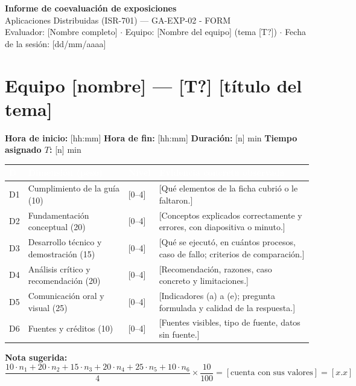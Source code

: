 \documentclass[11pt,a4paper]{article}
\newcommand{\hdr}[1]{\textcolor{white}{\textbf{#1}}}
\begin{document}
\begin{center}
	{\Large\bfseries\color{uteqBlue} Informe de coevaluación de exposiciones}\\[4pt]
	{\large Aplicaciones Distribuidas (ISR-701) --- GA-EXP-02 - FORM}\\[4pt]
	Evaluador: [Nombre completo] \quad $\cdot$ \quad Equipo: [Nombre del equipo] (tema [T?]) \quad $\cdot$ \quad Fecha de la sesión: [dd/mm/aaaa]
\end{center}

\section{Equipo [nombre] --- [T?] [título del tema]}

\textbf{Hora de inicio:} [hh:mm] \quad \textbf{Hora de fin:} [hh:mm] \quad \textbf{Duración:} [n] min \quad \textbf{Tiempo asignado $T$:} [n] min

\begin{tabularx}{\linewidth}{|C{0.9cm}|L{3.4cm}|C{1.1cm}|Y|}
	\hline
	\hdr{D} & \hdr{Dimensión (peso)} & \hdr{Nivel} & \hdr{Evidencia concreta observada} \\
	\hline
	D1 & Cumplimiento de la guía (10) & [0--4] & [Qué elementos de la ficha cubrió o le faltaron.] \\
	\hline
	D2 & Fundamentación conceptual (20) & [0--4] & [Conceptos explicados correctamente y errores, con diapositiva o minuto.] \\
	\hline
	D3 & Desarrollo técnico y demostración (15) & [0--4] & [Qué se ejecutó, en cuántos procesos, caso de fallo; criterios de comparación.] \\
	\hline
	D4 & Análisis crítico y recomendación (20) & [0--4] & [Recomendación, razones, caso concreto y limitaciones.] \\
	\hline
	D5 & Comunicación oral y visual (25) & [0--4] & [Indicadores (a) a (e); pregunta formulada y calidad de la respuesta.] \\
	\hline
	D6 & Fuentes y créditos (10) & [0--4] & [Fuentes visibles, tipo de fuente, datos sin fuente.] \\
	\hline
\end{tabularx}

\textbf{Nota sugerida:}
\[
	\frac{10 \cdot n_1 + 20 \cdot n_2 + 15 \cdot n_3 + 20 \cdot n_4 + 25 \cdot n_5 + 10 \cdot n_6}{4} \times \frac{10}{100} = [\text{cuenta con sus valores}] = [x.x]
\]
\end{document}
